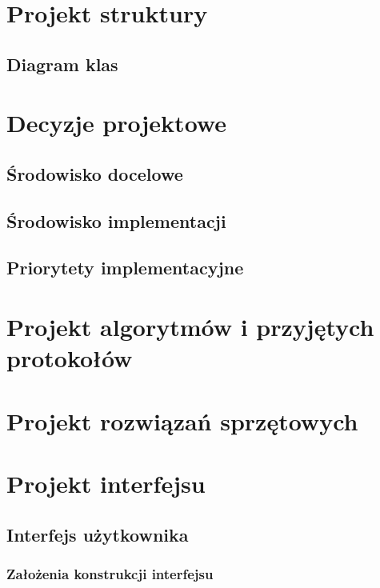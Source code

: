 \documentclass[11pt,oneside,a4paper,titlepage,onecolumn]{article}
\begin{document}
\section{Projekt struktury}

\subsection{Diagram klas}


\section{Decyzje projektowe}

\subsection{Środowisko docelowe}



\subsection{Środowisko implementacji}


\subsection{Priorytety implementacyjne}


\section{Projekt algorytmów i przyjętych protokołów}

\section{Projekt rozwiązań sprzętowych}



\section{Projekt interfejsu}

\subsection{Interfejs użytkownika}


\subsubsection{Założenia konstrukcji interfejsu}
\end{document}
